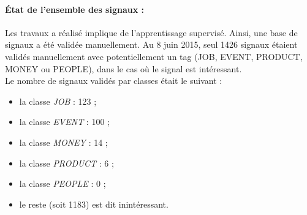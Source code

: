     \paragraph{État de l'ensemble des signaux :}
        Les travaux a réalisé implique de l’apprentissage supervisé. Ainsi, une base de signaux a été validée manuellement. Au 8 juin 2015, seul 1426 signaux étaient validés manuellement avec potentiellement un tag (JOB, EVENT, PRODUCT, MONEY ou PEOPLE), dans le cas où le signal est intéressant.\\
        Le nombre de signaux validés par classes était le suivant :
        \begin{itemize}
            \item la classe \textit{JOB} : 123 ;
            \item la classe \textit{EVENT} : 100 ;
            \item la classe \textit{MONEY} : 14 ;
            \item la classe \textit{PRODUCT} : 6 ;
            \item la classe \textit{PEOPLE} : 0 ;
            \item le reste (soit 1183) est dit \og inintéressant\fg.
        \end{itemize}
